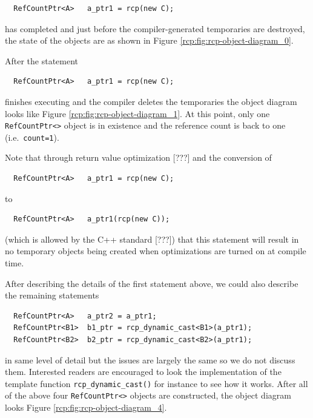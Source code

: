 {\scriptsize\begin{verbatim}
  RefCountPtr<A>   a_ptr1 = rcp(new C);
\end{verbatim}}

{}\noindent{}has completed and just before the compiler-generated
temporaries are destroyed, the state of the objects are as shown in
Figure {}\ref{rcp:fig:rcp-object-diagram_0}.

After the statement

{\scriptsize\begin{verbatim}
  RefCountPtr<A>   a_ptr1 = rcp(new C);
\end{verbatim}}

{}\noindent{}finishes executing and the compiler deletes the
temporaries the object diagram looks like Figure
{}\ref{rcp:fig:rcp-object-diagram_1}.  At this point, only one
{}\texttt{Ref\-Count\-Ptr<>} object is in existence and the reference
count is back to one (i.e.~{}\texttt{count=1}).

Note that through return value optimization [???] and the conversion
of

{\scriptsize\begin{verbatim}
  RefCountPtr<A>   a_ptr1 = rcp(new C);
\end{verbatim}}

{}\noindent{}to

{\scriptsize\begin{verbatim}
  RefCountPtr<A>   a_ptr1(rcp(new C));
\end{verbatim}}

{}\noindent{}(which is allowed by the C++ standard [???]) that this
statement will result in no temporary objects being created when
optimizations are turned on at compile time.

After describing the details of the first statement above, we could
also describe the remaining statements

{\scriptsize\begin{verbatim}
  RefCountPtr<A>   a_ptr2 = a_ptr1;
  RefCountPtr<B1>  b1_ptr = rcp_dynamic_cast<B1>(a_ptr1);
  RefCountPtr<B2>  b2_ptr = rcp_dynamic_cast<B2>(a_ptr1);
\end{verbatim}}

{}\noindent{}in same level of detail but the issues are largely the
same so we do not discuss them.  Interested readers are encouraged to
look the implementation of the template function
{}\texttt{rcp\-\_dynamic\-\_cast()} for instance to see how it works.
After all of the above four {}\texttt{Ref\-Count\-Ptr<>} objects are
constructed, the object diagram looks Figure
{}\ref{rcp:fig:rcp-object-diagram_4}.

